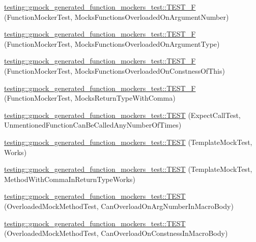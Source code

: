 \begin{DoxyCompactItemize}
\item 
\hyperlink{namespacetesting_1_1gmock__generated__function__mockers__test_a23b4f6d7bf9f6b35126ee137aa48ae3b}{testing\+::gmock\+\_\+generated\+\_\+function\+\_\+mockers\+\_\+test\+::\+T\+E\+S\+T\+\_\+F} (Function\+Mocker\+Test, Mocks\+Functions\+Overloaded\+On\+Argument\+Number)
\item 
\hyperlink{namespacetesting_1_1gmock__generated__function__mockers__test_a6fb9a5901e2d2066a9fe5a3d05c0cbe1}{testing\+::gmock\+\_\+generated\+\_\+function\+\_\+mockers\+\_\+test\+::\+T\+E\+S\+T\+\_\+F} (Function\+Mocker\+Test, Mocks\+Functions\+Overloaded\+On\+Argument\+Type)
\item 
\hyperlink{namespacetesting_1_1gmock__generated__function__mockers__test_ad580a4b2f97b3c2643794a627b347511}{testing\+::gmock\+\_\+generated\+\_\+function\+\_\+mockers\+\_\+test\+::\+T\+E\+S\+T\+\_\+F} (Function\+Mocker\+Test, Mocks\+Functions\+Overloaded\+On\+Constness\+Of\+This)
\item 
\hyperlink{namespacetesting_1_1gmock__generated__function__mockers__test_abb74ac8e211661c0d87c902f87002e6d}{testing\+::gmock\+\_\+generated\+\_\+function\+\_\+mockers\+\_\+test\+::\+T\+E\+S\+T\+\_\+F} (Function\+Mocker\+Test, Mocks\+Return\+Type\+With\+Comma)
\item 
\hyperlink{namespacetesting_1_1gmock__generated__function__mockers__test_ae0d5aa8e715f3c183f1ccdcf390187e7}{testing\+::gmock\+\_\+generated\+\_\+function\+\_\+mockers\+\_\+test\+::\+T\+E\+ST} (Expect\+Call\+Test, Unmentioned\+Function\+Can\+Be\+Called\+Any\+Number\+Of\+Times)
\item 
\hyperlink{namespacetesting_1_1gmock__generated__function__mockers__test_a5f59a7b507101fc0dbb558c090974f02}{testing\+::gmock\+\_\+generated\+\_\+function\+\_\+mockers\+\_\+test\+::\+T\+E\+ST} (Template\+Mock\+Test, Works)
\item 
\hyperlink{namespacetesting_1_1gmock__generated__function__mockers__test_aa998c7e5e8b6fd378cacb53663e8c4a6}{testing\+::gmock\+\_\+generated\+\_\+function\+\_\+mockers\+\_\+test\+::\+T\+E\+ST} (Template\+Mock\+Test, Method\+With\+Comma\+In\+Return\+Type\+Works)
\item 
\hyperlink{namespacetesting_1_1gmock__generated__function__mockers__test_a6542d3ae3f153907c32f3cf15a2ff6cf}{testing\+::gmock\+\_\+generated\+\_\+function\+\_\+mockers\+\_\+test\+::\+T\+E\+ST} (Overloaded\+Mock\+Method\+Test, Can\+Overload\+On\+Arg\+Number\+In\+Macro\+Body)
\item 
\hyperlink{namespacetesting_1_1gmock__generated__function__mockers__test_aa58ec93a77bee21244c10da2bc8cf70e}{testing\+::gmock\+\_\+generated\+\_\+function\+\_\+mockers\+\_\+test\+::\+T\+E\+ST} (Overloaded\+Mock\+Method\+Test, Can\+Overload\+On\+Constness\+In\+Macro\+Body)

\end{DoxyCompactItemize}
